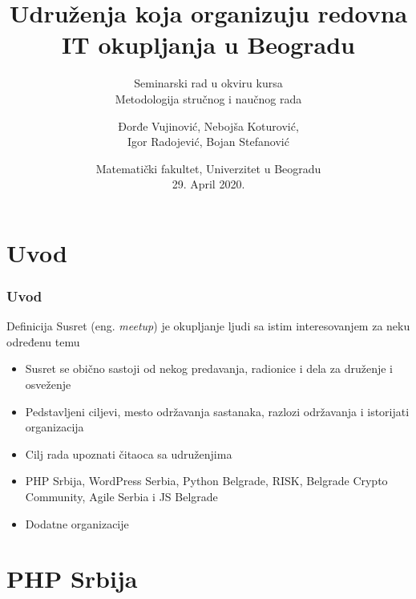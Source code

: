 \documentclass[hyperref={bookmarks=false},aspectratio=169]{beamer}
\title[]
{\bfseries{Udruženja koja organizuju redovna IT okupljanja u Beogradu}}
\subtitle{Seminarski rad u okviru kursa\\Metodologija stručnog i naučnog rada}
\author[]
{Đorđe Vujinović, Nebojša Koturović, \\Igor Radojević, Bojan Stefanović}
\date[ICUP, 2014]
{Matematički fakultet, Univerzitet u Beogradu\\29. April 2020.}
\begin{document}
\frame{\titlepage}  %


\section{Uvod}

\begin{frame}
\frametitle{Uvod}
\begin{block}{Definicija}
Susret (eng. \textit{meetup}) je okupljanje ljudi sa istim interesovanjem za neku određenu temu
\end{block}

\begin{itemize}
    \item Susret se obično sastoji od nekog predavanja, radionice i dela za druženje i osveženje
    \item Pedstavljeni ciljevi, mesto održavanja sastanaka, razlozi održavanja i istorijati organizacija
    \item Cilj rada upoznati čitaoca sa udruženjima
    \item PHP Srbija, WordPress Serbia, Python Belgrade, RISK, Belgrade Crypto Community, Agile Serbia i JS Belgrade
    \item Dodatne organizacije
\end{itemize}

\end{frame}



%
%

\section{PHP Srbija}
\end{document}
